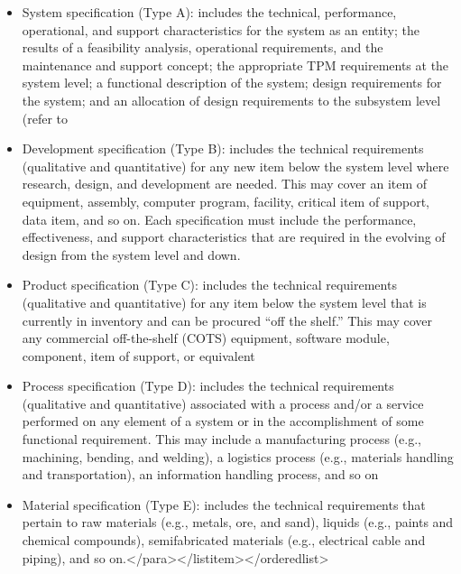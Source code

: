 \begin{itemize}
	\item System specification (Type A): includes the technical, performance, operational, and support characteristics for the system as an entity; the results of a feasibility analysis, operational requirements, and the maintenance and support concept; the appropriate TPM requirements at the system level; a functional description of the system; design requirements for the system; and an allocation of design requirements to the subsystem level (refer to 
	\item Development specification (Type B): includes the technical requirements (qualitative and quantitative) for any new item below the system level where research, design, and development are needed. This may cover an item of equipment, assembly, computer program, facility, critical item of support, data item, and so on. Each specification must include the performance, effectiveness, and support characteristics that are required in the evolving of design from the system level and down.
	\item Product specification (Type C): includes the technical requirements (qualitative and quantitative) for any item below the system level that is currently in inventory and can be procured “off the shelf.” This may cover any commercial off-the-shelf (COTS) equipment, software module, component, item of support, or equivalent
	\item Process specification (Type D): includes the technical requirements (qualitative and quantitative) associated with a process and/or a service performed on any element of a system or in the accomplishment of some functional requirement. This may include a manufacturing process (e.g., machining, bending, and welding), a logistics process (e.g., materials handling and transportation), an information handling process, and so on
	\item Material specification (Type E): includes the technical requirements that pertain to raw materials (e.g., metals, ore, and sand), liquids (e.g., paints and chemical compounds), semifabricated materials (e.g., electrical cable and piping), and so on.</para></listitem></orderedlist>
\end{itemize}

